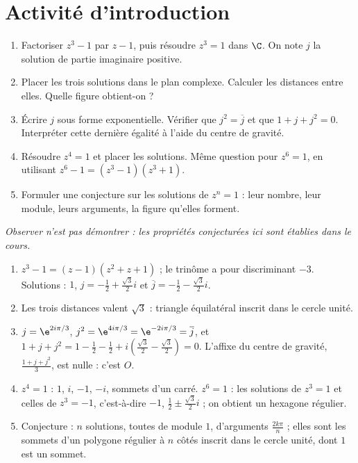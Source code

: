 \section{Activité d'introduction}
\begin{activity}[Les solutions de $z^n=1$ \mxchip{40 min}]
\begin{enumerate}
\item Factoriser $z^3-1$ par $z-1$, puis résoudre $z^3=1$ dans $\C$. On note $j$ la solution de partie imaginaire positive.
\item Placer les trois solutions dans le plan complexe. Calculer les distances entre elles. Quelle figure obtient-on ?
\item Écrire $j$ sous forme exponentielle. Vérifier que $j^2=\overline j$ et que $1+j+j^2=0$. Interpréter cette dernière égalité à l'aide du centre de gravité.
\item Résoudre $z^4=1$ et placer les solutions. Même question pour $z^6=1$, en utilisant $z^6-1=\left(z^3-1\right)\left(z^3+1\right)$.
\item Formuler une conjecture sur les solutions de $z^n=1$ : leur nombre, leur module, leurs arguments, la figure qu'elles forment.
\end{enumerate}
\par\emph{Observer n'est pas démontrer : les propriétés conjecturées ici sont établies dans le cours.}
\end{activity}
\begin{solution}[Activité]
\begin{enumerate}
\item $z^3-1=(z-1)\left(z^2+z+1\right)$ ; le trinôme a pour discriminant $-3$. Solutions : $1$, $j=-\frac12+\frac{\sqrt3}2i$ et $\overline j=-\frac12-\frac{\sqrt3}2i$.
\item Les trois distances valent $\sqrt3$ : triangle équilatéral inscrit dans le cercle unité.
\item $j=\e^{2i\pi/3}$, $j^2=\e^{4i\pi/3}=\e^{-2i\pi/3}=\overline j$, et $1+j+j^2=1-\frac12-\frac12+i\left(\frac{\sqrt3}2-\frac{\sqrt3}2\right)=0$. L'affixe du centre de gravité, $\frac{1+j+j^2}3$, est nulle : c'est $O$.
\item $z^4=1$ : $1$, $i$, $-1$, $-i$, sommets d'un carré. $z^6=1$ : les solutions de $z^3=1$ et celles de $z^3=-1$, c'est-à-dire $-1$, $\frac12\pm\frac{\sqrt3}2i$ ; on obtient un hexagone régulier.
\item Conjecture : $n$ solutions, toutes de module $1$, d'arguments $\frac{2k\pi}n$ ; elles sont les sommets d'un polygone régulier à $n$ côtés inscrit dans le cercle unité, dont $1$ est un sommet.
\end{enumerate}
\end{solution}

